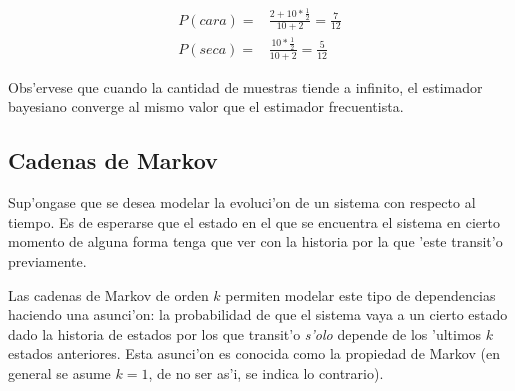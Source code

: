 \begin{align*}
P(cara) =& \frac{2 + 10*\frac{1}{2}}{10+2}  =\frac{7}{12} \\
P(seca) =& \frac{10*\frac{1}{2}}{10+2}      = \frac{5}{12}
\end{align*}

Obs'ervese que cuando la cantidad de muestras tiende a infinito, el estimador bayesiano converge al mismo valor que el estimador frecuentista.
%
%
%
%
%

\subsection{Cadenas de Markov}
Sup'ongase que se desea modelar la evoluci'on de un sistema con respecto al tiempo. Es de esperarse que 
el estado en el que se encuentra el sistema en cierto momento de alguna forma tenga que ver con la historia por la que 'este transit'o
previamente. 

Las cadenas de Markov de orden $k$ permiten modelar este tipo de dependencias haciendo una asunci'on: la probabilidad de que el sistema vaya a un cierto estado
dado la historia de estados por los que transit'o \emph{s'olo} depende de los 'ultimos $k$ estados anteriores. 
Esta asunci'on es conocida como la propiedad de Markov (en general se asume $k=1$, de no ser as'i, se indica lo contrario). 

